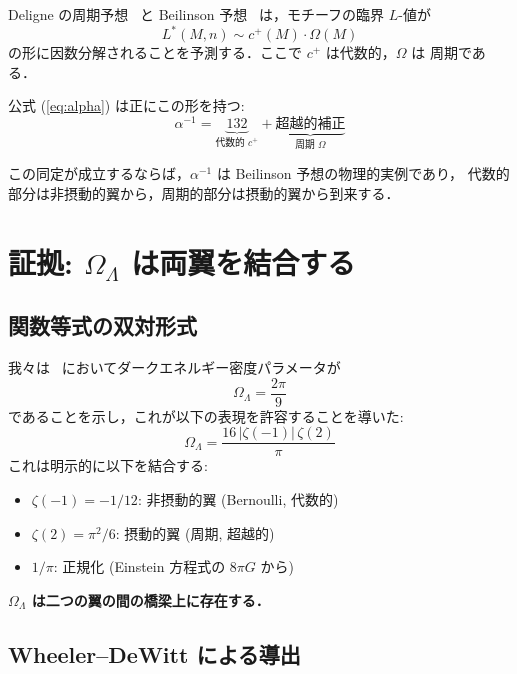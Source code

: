 \documentclass[11pt,a4paper]{article}
\begin{document}
Deligne の周期予想~\cite{Deligne1979} と Beilinson 予想~\cite{Beilinson1984}
は，モチーフの臨界 $L$-値が
\begin{equation}
L^*(M, n) \sim c^+(M) \cdot \Omega(M)
\end{equation}
の形に因数分解されることを予測する．ここで $c^+$ は代数的，$\Omega$ は
周期である．

公式 (\ref{eq:alpha}) は正にこの形を持つ:
\begin{equation}
\alpha^{-1} = \underbrace{132}_{\text{代数的 } c^+}
+ \underbrace{\text{超越的補正}}_{\text{周期 } \Omega}
\end{equation}

この同定が成立するならば，$\alpha^{-1}$ は Beilinson 予想の物理的実例であり，
代数的部分は非摂動的翼から，周期的部分は摂動的翼から到来する．

\section{証拠: $\Omega_\Lambda$ は両翼を結合する}

\subsection{関数等式の双対形式}

我々は~\cite{wb-wdw} においてダークエネルギー密度パラメータが
\begin{equation}
\Omega_\Lambda = \frac{2\pi}{9}
\end{equation}
であることを示し，これが以下の表現を許容することを導いた:
\begin{equation}\label{eq:omega-dual}
\Omega_\Lambda = \frac{16\,|\zeta(-1)|\,\zeta(2)}{\pi}
\end{equation}
これは明示的に以下を結合する:
\begin{itemize}
\item $\zeta(-1) = -1/12$: 非摂動的翼 (Bernoulli, 代数的)
\item $\zeta(2) = \pi^2/6$: 摂動的翼 (周期, 超越的)
\item $1/\pi$: 正規化 (Einstein 方程式の $8\pi G$ から)
\end{itemize}

\textbf{$\Omega_\Lambda$ は二つの翼の間の橋梁上に存在する．}

\subsection{Wheeler--DeWitt による導出}
\end{document}
